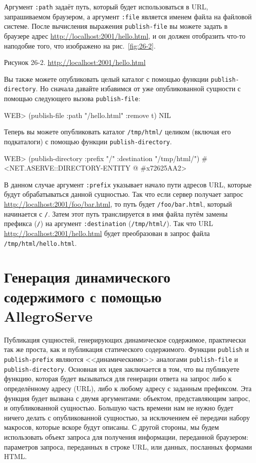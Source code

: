 Аргумент \lstinline{:path} задаёт путь, который будет использоваться в URL, запрашиваемом
браузером, а аргумент \lstinline{:file} является именем файла на файловой системе. После
вычисления выражения \lstinline{publish-file} вы можете задать в браузере адрес
\url{http://localhost:2001/hello.html}, и он должен отобразить что-то наподобие того, что
изображено на рис.~\ref{fig:26-2}.

Рисунок 26-2. \url{http://localhost:2001/hello.html}

Вы также можете опубликовать целый каталог с помощью функции \lstinline{publish-directory}. Но
сначала давайте избавимся от уже опубликованной сущности с помощью следующего вызова
\lstinline{publish-file}:

\begin{myverb}
  WEB> (publish-file :path "/hello.html" :remove t)
  NIL
\end{myverb}

Теперь вы можете опубликовать каталог \lstinline{/tmp/html/} целиком (включая его подкаталоги)
с помощью функции \lstinline{publish-directory}.

\begin{myverb}
  WEB> (publish-directory :prefix "/" :destination "/tmp/html/")
  #<NET.ASERVE::DIRECTORY-ENTITY @ #x72625AA2>
\end{myverb}

В данном случае аргумент \lstinline{:prefix} указывает начало пути адресов URL, которые будут
обрабатываться данной сущностью. Так что если сервер получает запрос
\url{http://localhost:2001/foo/bar.html}, то путь будет \lstinline{/foo/bar.html}, который
начинается с \lstinline{/}. Затем этот путь транслируется в имя файла путём замены префикса
(\lstinline{/}) на аргумент \lstinline{:destination} (\lstinline{/tmp/html/}). Так что URL
\url{http://localhost:2001/hello.html} будет преобразован в запрос файла
\lstinline{/tmp/html/hello.html}.

\section{Генерация динамического содержимого с помощью AllegroServe}

Публикация сущностей, генерирующих динамическое содержимое, практически так же проста, как
и публикация статического содержимого. Функции \lstinline{publish} и \lstinline{publish-prefix}
являются <<динамическими>> аналогами \lstinline{publish-file} и
\lstinline{publish-directory}. Основная их идея заключается в том, что вы публикуете функцию,
которая будет вызываться для генерации ответа на запрос либо к определённому адресу
(URL), либо к любому адресу с заданным префиксом. Эта функция будет вызвана с двумя
аргументами: объектом, представляющим запрос, и опубликованной сущностью. Большую часть
времени нам не нужно будет ничего делать с опубликованной сущностью, за исключением её
передачи набору макросов, которые вскоре будут описаны. С другой стороны, мы будем
использовать объект запроса для получения информации, переданной браузером: параметров
запроса, переданных в строке URL, или данных, посланных формами HTML.

